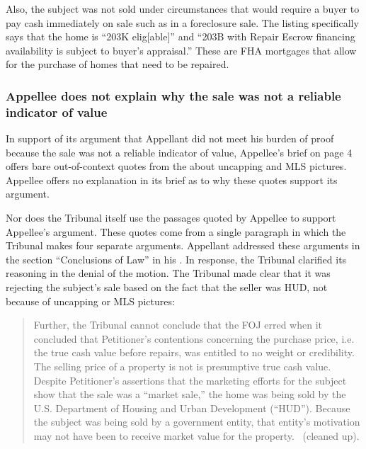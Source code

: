 \documentclass[12pt,\documentclassflag]{michiganCourtOfAppealsBrief}
\begin{document}
 Also, the subject was not sold under circumstances that would require a buyer to pay cash immediately on sale such as in a foreclosure sale.
 The listing specifically says that the home is ``203K elig[able]'' and ``203B with Repair Escrow financing availability is subject to buyer's appraisal.'' These are FHA mortgages that allow for the purchase of homes that need to be repaired. 

\subsubsection{Appellee does not explain why the sale was not a reliable indicator of value}

In support of its argument that Appellant did not meet his burden of proof because the sale was not a reliable indicator of value, Appellee's brief on page 4 offers bare out-of-context quotes from the \foj[5] about uncapping and MLS pictures. Appellee offers no explanation in its brief as to why these quotes support its argument.

Nor does the Tribunal itself use the passages quoted by Appellee to support Appellee's argument. These quotes come from a single paragraph in which the Tribunal makes four separate arguments.
Appellant addressed these arguments in the section ``Conclusions of Law'' in his \motionForReconsideration[4-5].
In response, the Tribunal clarified its reasoning in the denial of the motion. The Tribunal made clear that it was rejecting the subject's sale based on the fact that the seller was HUD, not because of uncapping or MLS pictures:

\begin{quote}
Further, the Tribunal cannot conclude that the FOJ erred when it
concluded that Petitioner's contentions concerning the purchase price, i.e. the true cash value before repairs, was entitled to no weight or credibility. The selling price of a property is not is presumptive true cash value. Despite Petitioner's assertions that the marketing efforts for the subject show that the sale was a ``market sale,'' the home was
being sold by the U.S. Department of Housing and Urban Development (``HUD''). Because the subject was being sold by a government entity, that entity's motivation may not have been to receive market value for the property. \reconsiderationDenied[2]\ (cleaned up).
\end{quote}
\end{document}
